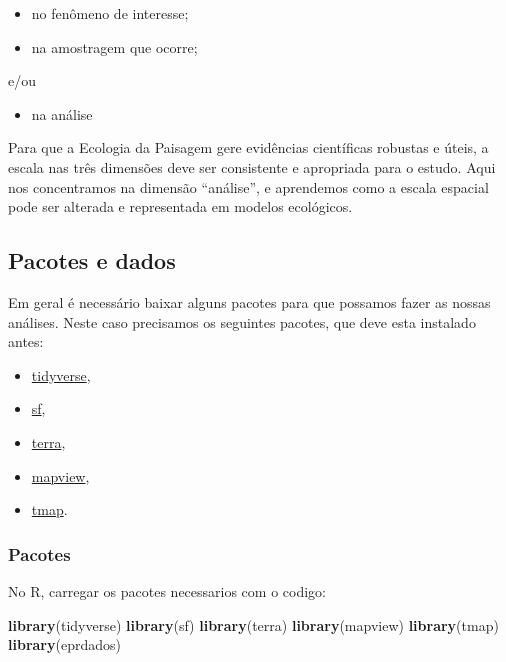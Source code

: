 \documentclass[
]{article}
\newenvironment{Shaded}{\begin{snugshade}}{\end{snugshade}}
\newcommand{\FunctionTok}[1]{\textcolor[rgb]{0.13,0.29,0.53}{\textbf{#1}}}
\newcommand{\NormalTok}[1]{#1}
\providecommand{\tightlist}{%
  \setlength{\itemsep}{0pt}\setlength{\parskip}{0pt}}
\begin{document}
\begin{itemize}
\tightlist
\item
  no fenômeno de interesse;
\item
  na amostragem que ocorre;
\end{itemize}

e/ou

\begin{itemize}
\tightlist
\item
  na análise
\end{itemize}

Para que a Ecologia da Paisagem gere evidências científicas robustas e úteis, a escala nas três dimensões deve ser consistente e apropriada para o estudo. Aqui nos concentramos na dimensão ``análise'', e aprendemos como a escala espacial pode ser alterada e representada em modelos ecológicos.

\newpage

\hypertarget{pacotes-e-dados}{%
\subsection{Pacotes e dados}\label{pacotes-e-dados}}

Em geral é necessário baixar alguns pacotes para que possamos fazer as nossas análises. Neste caso precisamos os seguintes pacotes, que deve esta instalado antes:

\begin{itemize}
\tightlist
\item
  \href{https://www.tidyverse.org/}{tidyverse},
\item
  \href{https://r-spatial.github.io/sf/}{sf},
\item
  \href{https://rspatial.org/pkg/1-introduction.html}{terra},
\item
  \href{https://r-spatial.github.io/mapview/}{mapview},
\item
  \href{https://r-tmap.github.io/tmap-book/}{tmap}.
\end{itemize}

\hypertarget{pacotes}{%
\subsubsection{Pacotes}\label{pacotes}}

No R, carregar os pacotes necessarios com o codigo:

\begin{Shaded}
\begin{Highlighting}[]
\FunctionTok{library}\NormalTok{(tidyverse)}
\FunctionTok{library}\NormalTok{(sf)}
\FunctionTok{library}\NormalTok{(terra)}
\FunctionTok{library}\NormalTok{(mapview)}
\FunctionTok{library}\NormalTok{(tmap)}
\FunctionTok{library}\NormalTok{(eprdados)}
\end{Highlighting}
\end{Shaded}
\end{document}
